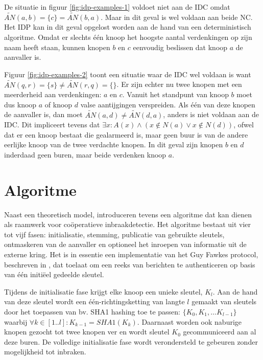 De situatie in figuur \ref{fig:idp-examples-1} voldoet niet aan de IDC omdat
$\tilde{AN}(a,b) = \{c\} = \tilde{AN}(b,a)$. Maar in dit geval is wel voldaan
aan beide NC. Het IDP kan in dit geval opgelost worden aan de hand van een
deterministisch algoritme. Omdat er slechts \'e\'en knoop het hoogste aantal
verdenkingen op zijn naam heeft staan, kunnen knopen $b$ en $c$ eenvoudig
beslissen dat knoop $a$ de aanvaller is.

Figuur \ref{fig:idp-examples-2} toont een situatie waar de IDC wel voldaan is
want $\tilde{AN}(q,r) = \{s\} \not= \tilde{AN}(r,q) = \{\}$. Er zijn echter nu
twee knopen met een meerderheid aan verdenkingen: $a$ en $c$. Vanuit het
standpunt van knoop $b$ moet dus knoop $a$ of knoop $d$ valse aantijgingen
verspreiden. Als \'e\'en van deze knopen de aanvaller is, dan moet
$\tilde{AN}(a,d) \not= \tilde{AN}(d,a)$, anders is niet voldaan aan de IDC. Dit
impliceert tevens dat $\exists x : A(x) \wedge ( x \not\in N(a) \vee x \not\in
N(d) )$, ofwel dat er een knoop bestaat die gealarmeerd is, maar geen buur is
van de andere eerlijke knoop van de twee verdachte knopen. In dit geval zijn
knopen $b$ en $d$ inderdaad geen buren, maar beide verdenken knoop $a$.

\section{Algoritme}
\label{section:cooperation-algorithm}

Naast een theoretisch model, introduceren \citep{krontiris2009cooperative}
tevens een algoritme dat kan dienen als raamwerk voor co\"operatieve
inbraakdetectie. Het algoritme bestaat uit vier tot vijf fasen: initialisatie,
stemming, publicatie van gebruikte sleutels, ontmaskeren van de aanvaller en
optioneel het inroepen van informatie uit de externe kring. Het is in essentie
een implementatie van het Guy Fawkes protocol, beschreven in
\citep{anderson1998new}, dat toelaat om een reeks van berichten te authenticeren
op basis van \'e\'en initi\"eel gedeelde sleutel.

Tijdens de initialisatie fase krijgt elke knoop een unieke sleutel, $K_l$. Aan
de hand van deze sleutel wordt een \'e\'en-richtingsketting van langte $l$
gemaakt van sleutels door het toepassen van bv. SHA1 \citep{rfc:3174} hashing
toe te passen: $\{K_0, K_1,\dots K_{l-1}\}$ waarbij $\forall k \in [1..l] :
K_{k-1} = SHA1(K_k)$. Daarnaast worden ook naburige knopen gezocht tot twee
knopen ver en wordt sleutel $K_0$ gecommuniceerd aan al deze buren. De
volledige initialisatie fase wordt verondersteld te gebeuren zonder
mogelijkheid tot inbraken.


